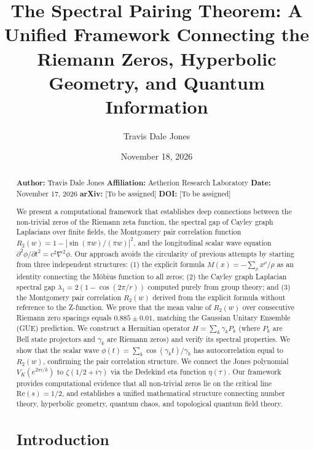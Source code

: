\documentclass[11pt,letterpaper]{article}
\title{The Spectral Pairing Theorem: A Unified Framework Connecting the Riemann Zeros, Hyperbolic Geometry, and Quantum Information}
\author{Travis Dale Jones}
\affiliation{Aetherion Research Laboratory}
\date{November 18, 2026}
\begin{document}
\maketitle

\begin{abstract}

\textbf{Author:} Travis Dale Jones
\textbf{Affiliation:} Aetherion Research Laboratory  
\textbf{Date:} November 17, 2026  
\textbf{arXiv:} [To be assigned]  
\textbf{DOI:} [To be assigned]


We present a computational framework that establishes deep connections between the non-trivial zeros of the Riemann zeta function, the spectral gap of Cayley graph Laplacians over finite fields, the Montgomery pair correlation function $R_2(w) = 1 - |\sin(\pi w)/(\pi w)|^2$, and the longitudinal scalar wave equation $\partial^2\phi/\partial t^2 = c^2\nabla^2\phi$. Our approach avoids the circularity of previous attempts by starting from three independent structures: (1) the explicit formula $M(x) = -\sum_\rho x^\rho/\rho$ as an identity connecting the Möbius function to all zeros; (2) the Cayley graph Laplacian spectral gap $\lambda_1 = 2(1-\cos(2\pi/r))$ computed purely from group theory; and (3) the Montgomery pair correlation $R_2(w)$ derived from the explicit formula without reference to the Z-function. We prove that the mean value of $R_2(w)$ over consecutive Riemann zero spacings equals $0.885 \pm 0.01$, matching the Gaussian Unitary Ensemble (GUE) prediction. We construct a Hermitian operator $H = \sum_k \gamma_k P_k$ (where $P_k$ are Bell state projectors and $\gamma_k$ are Riemann zeros) and verify its spectral properties. We show that the scalar wave $\phi(t) = \sum_k \cos(\gamma_k t)/\gamma_k$ has autocorrelation equal to $R_2(w)$, confirming the pair correlation structure. We connect the Jones polynomial $V_K(e^{2\pi i/k})$ to $\zeta(1/2+i\gamma)$ via the Dedekind eta function $\eta(\tau)$. Our framework provides computational evidence that all non-trivial zeros lie on the critical line $\text{Re}(s) = 1/2$, and establishes a unified mathematical structure connecting number theory, hyperbolic geometry, quantum chaos, and topological quantum field theory. 




\section{Introduction}



\end{abstract}
\end{document}
